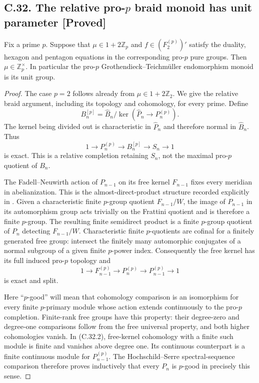 \documentclass[11pt]{article}
\newcommand{\statement}[3]{\subsection*{#1. #3 [#2]}}
\begin{document}
\statement{C.32}{Proved}{The relative pro-$p$ braid monoid has unit parameter}
Fix a prime $p$. Suppose that
$\mu\in1+2\mathbb Z_p$ and $f\in(F_2^{(p)})'$ satisfy the duality,
hexagon and pentagon equations in the corresponding pro-$p$ pure
groups. Then $\mu\in\mathbb Z_p^\times$. In particular the pro-$p$
Grothendieck--Teichm\"uller endomorphism monoid is its unit group.

\begin{proof}
The case $p=2$ follows already from $\mu\in1+2\mathbb Z_2$.
We give the relative braid argument, including its topology and
cohomology, for every prime. Define
\[
 B_n^{[p]}=\widehat B_n/
       \ker(\widehat P_n\longrightarrow P_n^{(p)}).
\]
The kernel being divided out is characteristic in $\widehat P_n$
and therefore normal in $\widehat B_n$. Thus
\[
 1\longrightarrow P_n^{(p)}\longrightarrow B_n^{[p]}
       \longrightarrow S_n\longrightarrow1                    \tag{C.32.1}
\]
is exact. This is a relative completion retaining $S_n$, not the
maximal pro-$p$ quotient of $B_n$.

The Fadell--Neuwirth action of $P_{n-1}$ on its free kernel
$F_{n-1}$ fixes every meridian in abelianization. This is the
almost-direct-product structure recorded explicitly in
\cite[Example 1.1]{CECohen2010}. Given a characteristic finite
$p$-group quotient $F_{n-1}/W$, the image of $P_{n-1}$ in its
automorphism group acts trivially on the Frattini quotient and
is therefore a finite $p$-group. The resulting finite semidirect
product is a finite $p$-group quotient of $P_n$ detecting
$F_{n-1}/W$. Characteristic finite $p$-quotients are cofinal for a
finitely generated free group: intersect the finitely many
automorphic conjugates of a normal subgroup of a given finite
$p$-power index. Consequently the free kernel has its full
induced pro-$p$ topology and
\[
 1\longrightarrow F_{n-1}^{(p)}\longrightarrow P_n^{(p)}
       \longrightarrow P_{n-1}^{(p)}\longrightarrow1             \tag{C.32.2}
\]
is exact and split.

Here ``$p$-good'' will mean that cohomology comparison is an
isomorphism for every finite $p$-primary module whose action extends
continuously to the pro-$p$ completion. Finite-rank free groups have
this property: their degree-zero and degree-one comparisons follow
from the free universal property, and both higher cohomologies
vanish. In (C.32.2), free-kernel cohomology with a finite such module
is finite and vanishes above degree one. Its continuous counterpart
is a finite continuous module for $P_{n-1}^{(p)}$. The
Hochschild--Serre spectral-sequence comparison therefore proves
inductively that every $P_n$ is $p$-good in precisely this sense.


\end{proof}
\end{document}
